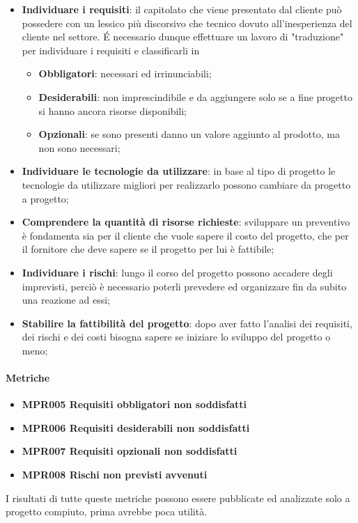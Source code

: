 		\begin{itemize}
			\item \textbf{Individuare i requisiti}: il capitolato che viene presentato dal cliente può possedere con un lessico più discorsivo che tecnico dovuto all'inesperienza del cliente nel settore. \'E necessario dunque effettuare un lavoro di "traduzione" per individuare i requisiti e classificarli in
			
			\begin{itemize}
				\item \textbf{Obbligatori}: necessari ed irrinunciabili;
				\item \textbf{Desiderabili}: non imprescindibile e da aggiungere solo se a fine progetto si hanno ancora risorse disponibili;  
				\item \textbf{Opzionali}: se sono presenti danno un valore aggiunto al prodotto, ma non sono necessari;
			\end{itemize}
			\item \textbf{Individuare le tecnologie da utilizzare}: in base al tipo di progetto le tecnologie da utilizzare migliori per realizzarlo possono cambiare da progetto a progetto;
			\item \textbf{Comprendere la quantità di risorse richieste}: sviluppare un preventivo è fondamenta sia per il cliente che vuole sapere il costo del progetto, che per il fornitore che deve sapere se il progetto per lui è fattibile;
			\item \textbf{Individuare i rischi}: lungo il corso del progetto possono accadere degli imprevisti, perciò è necessario poterli prevedere ed organizzare fin da subito una reazione ad essi;
			\item \textbf{Stabilire la fattibilità del progetto}: dopo aver fatto l'analisi dei requisiti, dei rischi e dei costi bisogna sapere se iniziare lo sviluppo del progetto o meno;
		\end{itemize}
		
		\paragraph*{Metriche}
		
		\begin{itemize}
			\item \textbf{MPR005 Requisiti obbligatori non soddisfatti}
			\item \textbf{MPR006 Requisiti desiderabili non soddisfatti}
			\item \textbf{MPR007 Requisiti opzionali non soddisfatti}
			\item \textbf{MPR008 Rischi non previsti avvenuti}
		\end{itemize}
		I risultati di tutte queste metriche possono essere pubblicate ed analizzate solo a progetto compiuto, prima avrebbe poca utilità. 
	
